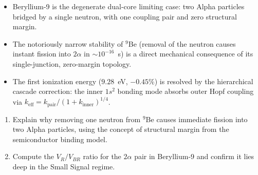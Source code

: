 \begin{summarybox}
\begin{itemize}
    \item Beryllium-9 is the degenerate dual-core limiting case: two Alpha particles bridged by a single neutron, with one coupling pair and zero structural margin.
    \item The notoriously narrow stability of $^9$Be (removal of the neutron causes instant fission into $2\alpha$ in $\sim 10^{-16}$~s) is a direct mechanical consequence of its single-junction, zero-margin topology.
    \item The first ionization energy ($9.28$~eV, $-0.45\%$) is resolved by the hierarchical cascade correction: the inner $1s^2$ bonding mode absorbs outer Hopf coupling via $k_\text{eff} = k_\text{pair}/(1+k_\text{inner})^{1/4}$.
\end{itemize}
\end{summarybox}

\begin{exercisebox}
\begin{enumerate}
    \item Explain why removing one neutron from $^9$Be causes immediate fission into two Alpha particles, using the concept of structural margin from the semiconductor binding model.
    \item Compute the $V_R/V_{BR}$ ratio for the $2\alpha$ pair in Beryllium-9 and confirm it lies deep in the Small Signal regime.
\end{enumerate}
\end{exercisebox}

